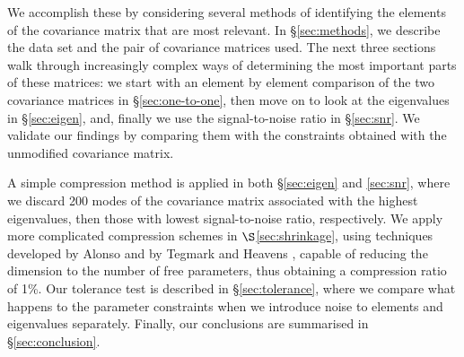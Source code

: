 \documentclass[twocolumn]{\docclass}
\newcommand{\rsec}[1]{\S\ref{sec:#1}}
\begin{document}
	We accomplish these by considering several methods of identifying the elements of the covariance matrix that are most relevant. %
	In \rsec{methods}, we describe the data set and the pair of covariance matrices used. The next three sections walk through increasingly complex ways of determining the most important parts of these matrices: we start with an element by element comparison of  the two covariance matrices in \rsec{one-to-one}, then move on to look at the eigenvalues in \rsec{eigen}, and, finally we use the signal-to-noise ratio in \rsec{snr}. We validate our findings by comparing them with the constraints obtained with the unmodified covariance matrix. %
	
	A simple compression method is applied in both \rsec{eigen} and \ref{sec:snr}, where we discard 200 modes of the covariance matrix associated with the highest eigenvalues, then those with lowest signal-to-noise ratio, respectively. We apply more complicated compression schemes in  $\S$\ref{sec:shrinkage}, using techniques developed by Alonso \citep{Alonso:2017hhj} and by Tegmark and Heavens \citep{Tegmark:1997maa}, capable of reducing the dimension to the number of free parameters, thus obtaining  a compression ratio of 1\%. Our tolerance test is described in \rsec{tolerance}, where we compare what happens to the parameter constraints when we introduce noise to elements and eigenvalues separately. Finally, our conclusions are summarised in \rsec{conclusion}.
	
	
\end{document}
